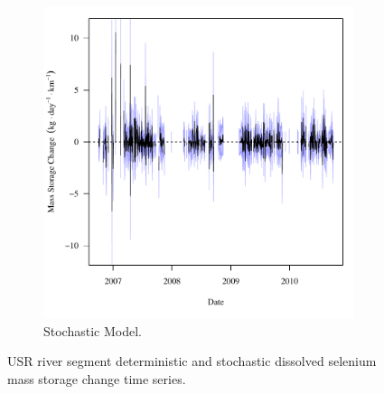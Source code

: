\begin{linenumbers}
\begin{landscape}
\begin{figure}
\begin{subfigure}{0.7\textwidth}
			\includegraphics[width=\tableCustomSize]{"Figures/Results_USR/Stochastic/f Segment C"}
			\caption{Stochastic Model.}
		\end{subfigure}
		\caption{USR river segment deterministic and stochastic dissolved selenium mass storage change time series.}
	\end{figure}
\end{landscape}


\end{linenumbers}
